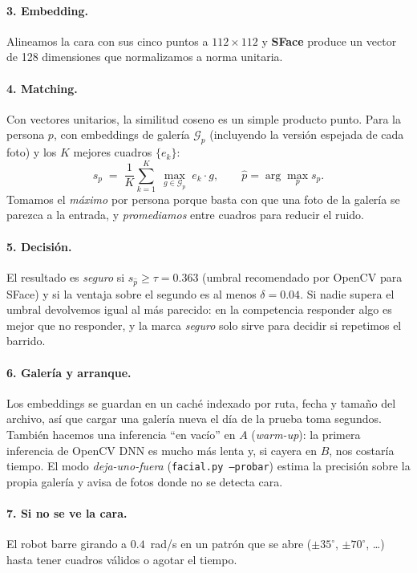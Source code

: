 \documentclass[11pt,a4paper]{article}
\newcommand{\cmd}[1]{\texttt{\small #1}}
\begin{document}
\paragraph{3. Embedding.} Alineamos la cara con sus cinco puntos a $112\times112$ y \textbf{SFace} produce un vector de 128 dimensiones que normalizamos
a norma unitaria.

\paragraph{4. Matching.} Con vectores unitarios, la similitud coseno es un simple producto punto. Para la persona $p$, con embeddings de galer\'ia
$\mathcal{G}_p$ (incluyendo la versi\'on espejada de cada foto) y los $K$ mejores cuadros $\{e_k\}$:
\[
  s_p \;=\; \frac{1}{K}\sum_{k=1}^{K}\;\max_{g\in\mathcal{G}_p}\; e_k\!\cdot g, \qquad \hat p=\arg\max_p s_p .
\]
Tomamos el \emph{m\'aximo} por persona porque basta con que una foto de la galer\'ia se parezca a la entrada, y \emph{promediamos} entre cuadros para
reducir el ruido.

\paragraph{5. Decisi\'on.} El resultado es \emph{seguro} si $s_{\hat p}\ge\tau=0.363$ (umbral recomendado por OpenCV para SFace) y si la ventaja sobre el
segundo es al menos $\delta=0.04$. Si nadie supera el umbral devolvemos igual al m\'as parecido: en la competencia responder algo es mejor que no responder,
y la marca \emph{seguro} solo sirve para decidir si repetimos el barrido.

\paragraph{6. Galer\'ia y arranque.} Los embeddings se guardan en un cach\'e indexado por ruta, fecha y tama\~no del archivo, as\'i que cargar una galer\'ia
nueva el d\'ia de la prueba toma segundos. Tambi\'en hacemos una inferencia ``en vac\'io'' en $A$ (\emph{warm-up}): la primera inferencia de OpenCV DNN es mucho m\'as
lenta y, si cayera en $B$, nos costar\'ia tiempo. El modo \emph{deja-uno-fuera} (\cmd{facial.py --probar}) estima la precisi\'on sobre la propia galer\'ia y
avisa de fotos donde no se detecta cara.

\paragraph{7. Si no se ve la cara.} El robot barre girando a $0.4$~rad/s en un patr\'on que se abre ($\pm35^\circ$, $\pm70^\circ$, \dots) hasta tener cuadros
v\'alidos o agotar el tiempo.
\end{document}
